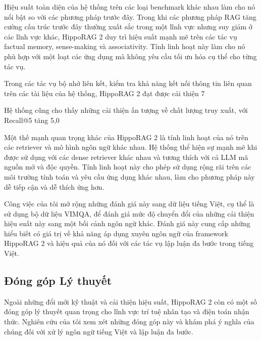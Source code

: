 \documentclass[../main.tex]{subfiles}
\begin{document}
Hiệu suất toàn diện của hệ thống trên các loại benchmark khác nhau làm cho nó nổi bật so với các phương pháp trước đây. Trong khi các phương pháp RAG tăng cường cấu trúc trước đây thường xuất sắc trong một lĩnh vực nhưng suy giảm ở các lĩnh vực khác, HippoRAG 2 duy trì hiệu suất mạnh mẽ trên các tác vụ factual memory, sense-making và associativity. Tính linh hoạt này làm cho nó phù hợp với một loạt các ứng dụng mà không yêu cầu tối ưu hóa cụ thể cho từng tác vụ.

Trong các tác vụ bộ nhớ liên kết, kiểm tra khả năng kết nối thông tin liên quan trên các tài liệu của hệ thống, HippoRAG 2 đạt được cải thiện 7%

Hệ thống cũng cho thấy những cải thiện ấn tượng về chất lượng truy xuất, với Recall@5 tăng 5,0%

Một thế mạnh quan trọng khác của HippoRAG 2 là tính linh hoạt của nó trên các retriever và mô hình ngôn ngữ khác nhau. Hệ thống thể hiện sự mạnh mẽ khi được sử dụng với các dense retriever khác nhau và tương thích với cả LLM mã nguồn mở và độc quyền. Tính linh hoạt này cho phép sử dụng rộng rãi trên các môi trường tính toán và yêu cầu ứng dụng khác nhau, làm cho phương pháp này dễ tiếp cận và dễ thích ứng hơn.

Công việc của tôi mở rộng những đánh giá này sang dữ liệu tiếng Việt, cụ thể là sử dụng bộ dữ liệu VIMQA, để đánh giá mức độ chuyển đổi của những cải thiện hiệu suất này sang một bối cảnh ngôn ngữ khác. Đánh giá này cung cấp những hiểu biết có giá trị về khả năng áp dụng xuyên ngôn ngữ của framework HippoRAG 2 và hiệu quả của nó đối với các tác vụ lập luận đa bước trong tiếng Việt.

\subsection{Đóng góp Lý thuyết}
Ngoài những đổi mới kỹ thuật và cải thiện hiệu suất, HippoRAG 2 còn có một số đóng góp lý thuyết quan trọng cho lĩnh vực trí tuệ nhân tạo và điện toán nhận thức. Nghiên cứu của tôi xem xét những đóng góp này và khám phá ý nghĩa của chúng đối với xử lý ngôn ngữ tiếng Việt và lập luận đa bước.
\end{document}
